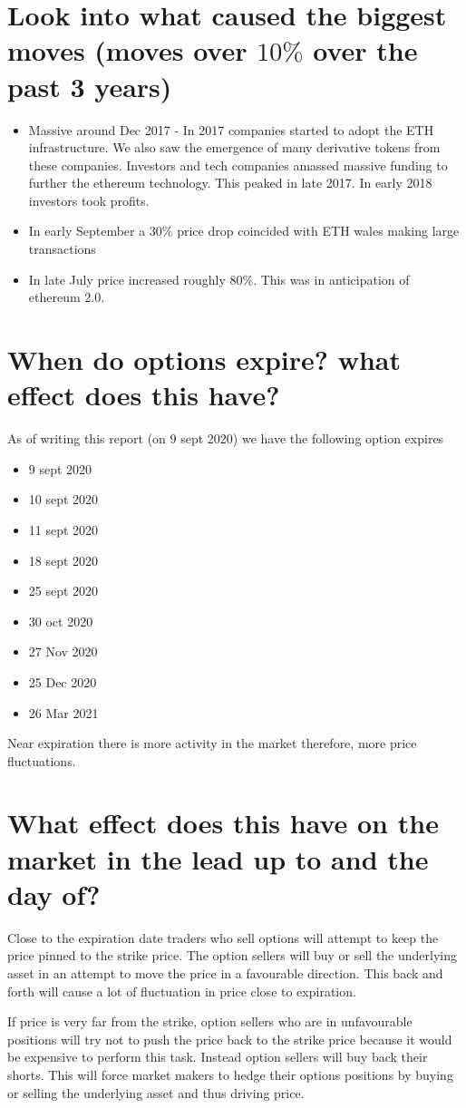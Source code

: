 \section{ Look into what caused the biggest moves (moves over $10 \%$  over the past 3 years)}
\begin{itemize}
\item Massive around Dec 2017 - In 2017 companies started to adopt the ETH infrastructure.  We also saw the emergence of many derivative tokens from these companies. Investors and tech companies amassed massive funding to further the ethereum technology.  This peaked in late 2017. In early 2018 investors took profits.
\item In early September a 30\% price drop coincided with ETH wales making large transactions
\item In late July price increased roughly 80\%.  This was in anticipation of ethereum 2.0.

\end{itemize}
\section{ When do options expire? what effect does this have?}

As of writing this report (on 9 sept 2020) we have the following option expires 

\begin{itemize}
\item 9 sept 2020
\item 10 sept 2020
\item 11 sept 2020
\item 18 sept 2020
\item 25 sept 2020
\item 30 oct 2020
\item 27 Nov 2020
\item 25 Dec 2020
\item 26 Mar 2021
\end{itemize}

Near expiration there is more activity in the market therefore, more price fluctuations.

\section{ What effect does this have on the market in the lead up to and the day of?}

Close to the expiration date traders who sell options will attempt to keep the price pinned to the strike price.  The option sellers will buy or sell the underlying asset in an attempt to move the price in a favourable direction.  This back and forth will cause a lot of fluctuation in price close to expiration. 

If price is very far from the strike, option sellers who are in unfavourable positions will try not to push the price back to the strike price because it would be expensive to perform this task. Instead option sellers will buy back their shorts. This will force market makers to hedge their options positions by buying or selling the underlying asset and thus driving price. \cite{op}

